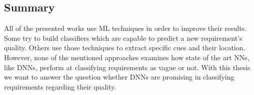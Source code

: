 \subsection{Summary}
All of the presented works use \ac{ML} techniques in order to improve their results.
Some try to build classifiers which are capable to predict a new requirement's quality.
Others use those techniques to extract specific cues and their location.
However, none of the mentioned approaches examines how state of the art \acp{NN}, like \acp{DNN}, perform at classifying requirements as vague or not.
With this thesis we want to answer the question whether \acp{DNN} are promising in classifying requirements regarding their quality.
